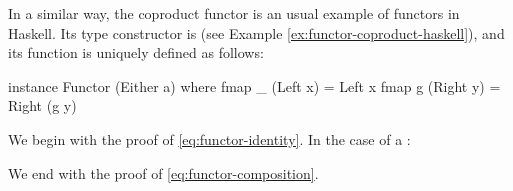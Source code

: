 \begin{example}
  \label{ex:functor-coproduct-haskell}


  In a similar way, the coproduct functor is an usual example of
  functors in Haskell. Its type constructor is 
  (see Example \ref{ex:functor-coproduct-haskell}), and its
   function is uniquely defined as follows:
  \begin{codehaskell}
instance Functor (Either a) where
  fmap _ (Left x)  = Left x
  fmap g (Right y) = Right (g y)
  \end{codehaskell}



  We begin with the proof of \eqref{eq:functor-identity}. In the case
  of a :

  \vspace{1em}
  \begin{steps}
  \end{steps}
  \begin{steps}
  \end{steps}
  We end with the proof of \eqref{eq:functor-composition}.


\end{example}
